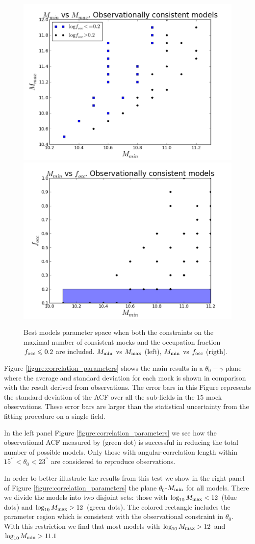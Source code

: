\documentclass[usenatbib]{mn2e}
\begin{document}
\begin{figure}
\begin{center}
\includegraphics[width=0.46\linewidth,angle=0]{./plots/mmin_vs_mmax.pdf}
\hspace{5mm}
\includegraphics[width=0.46\linewidth,angle=0]{./plots/mmin_vs_focc.pdf}
\end{center}
\caption{Best models parameter space when both the constraints on the
  maximal number of  consistent mocks and the occupation  fraction
  $f_{\rm occ}\leq  0.2$ are included. $M_{\rm min}$ vs $M_{\rm max}$
  (left), $M_{\rm min}$ vs $f_{\rm occ}$ (rigth).
  \label{fig:restriction_mock_and_f_occ_corr}} 
\end{figure} 


Figure \ref{figure:correlation_parameters} shows the main results in a
$\theta_{0}-\gamma$  plane where the average and standard deviation
for each mock is shown in comparison with the result derived from
observations.  The error bars in this Figure represents the standard
deviation of the ACF over all the sub-fields in the 15 mock
observations. These error bars are larger than the statistical
uncertainty from the fitting procedure on a single field.

In the left panel Figure \ref{figure:correlation_parameters} we see how
the observational ACF measured by \cite{Hayashino2004} (green dot) is
successful in reducing the total number of possible models. Only those
with angular-correlation length within
$15^{\prime\prime}<\theta_{0}<23^{\prime\prime}$ are considered to
reproduce observations.    


In order to better illustrate the results from this test we
show in the right panel of Figure \ref{figure:correlation_parameters} 
the plane $\theta_{0}$-$M_{\rm min}$ for all models. There we divide
the models into two disjoint sets: those with $\log_{10} M_{\rm
    max}<12$ (blue dots) and $\log_{10} M_{\rm
    max}>12$ (green dots). The colored rectangle includes
the parameter region which is consistent with the observational
constraint in $\theta_{0}$. With this restriction we find that most
models with $\log_{10} M_{\rm max}>12$ and  $\log_{10} M_{\rm min}>11.1$ 
\end{document}
